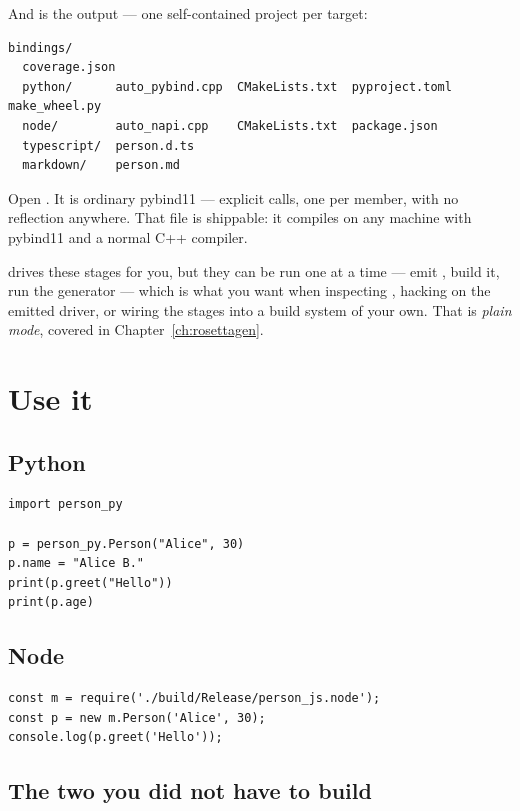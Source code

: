 And  is the output --- one self-contained project per target:

\begin{lstlisting}[style=plain]
bindings/
  coverage.json
  python/      auto_pybind.cpp  CMakeLists.txt  pyproject.toml  make_wheel.py
  node/        auto_napi.cpp    CMakeLists.txt  package.json
  typescript/  person.d.ts
  markdown/    person.md
\end{lstlisting}

Open . It is ordinary pybind11 --- explicit
 calls, one per member, with no reflection anywhere. That file is
shippable: it compiles on any machine with pybind11 and a normal C++
compiler.

\begin{note}
 drives these stages for you, but they can be run one at a time
--- emit , build it, run the generator --- which is what you want
when inspecting , hacking on the emitted driver, or wiring the
stages into a build system of your own. That is \emph{plain mode}, covered in
Chapter~\ref{ch:rosettagen}.
\end{note}

\section{Use it}

\subsection*{Python}

\begin{lstlisting}[style=py]
import person_py

p = person_py.Person("Alice", 30)
p.name = "Alice B."
print(p.greet("Hello"))
print(p.age)
\end{lstlisting}

\subsection*{Node}

\begin{lstlisting}[style=js]
const m = require('./build/Release/person_js.node');
const p = new m.Person('Alice', 30);
console.log(p.greet('Hello'));
\end{lstlisting}

\subsection*{The two you did not have to build}


